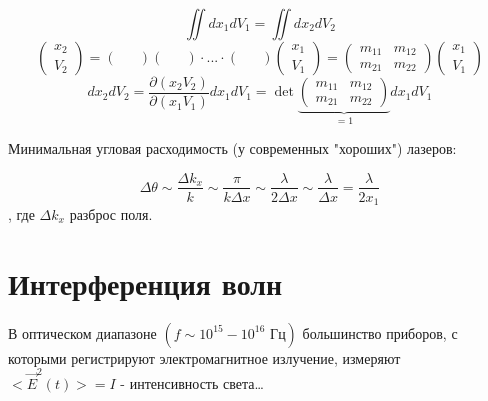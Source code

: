 \documentclass[12pt, a4paper]{report}
\begin{document}
\begin{theorem}
    \[ \iint d x_1 d V_1 = \iint d x_2 d V_2  \] 
    \[\begin{pmatrix}
    x_2\\
    V_2
    \end{pmatrix} = \begin{pmatrix}
    &\\
    &
    \end{pmatrix} 
    \begin{pmatrix}
        &\\
        &
    \end{pmatrix} \cdot ... \cdot 
    \begin{pmatrix}
        &\\
        &
    \end{pmatrix}
    \begin{pmatrix}
        x_1\\
        V_1
    \end{pmatrix} =\begin{pmatrix}
    m_{11}  & m_{12}\\
    m_{21}& m_{22} 
    \end{pmatrix} 
    \begin{pmatrix}
        x_1\\
        V_1
    \end{pmatrix}    \] 
    \[ d x_2 d V_2  = \frac{\partial  (x_2 V_2 )}{\partial (x_1  V_1 )} d x_1 d V_1 = \det \underbrace{\begin{pmatrix}
        m_{11}  & m_{12}\\
        m_{21}& m_{22}
    \end{pmatrix} }_{= 1} d x_1 d V_1 \] 
\end{theorem} 

Минимальная угловая расходимость (у современных "хороших") лазеров: 

\[ \Delta \theta \sim \frac{\Delta k_x}{k } \sim  \frac{\pi}{k \Delta x } \sim  \frac{ \lambda }{2 \Delta x } \sim \frac{\lambda }{\Delta x } = \frac{\lambda }{2 x_1 }      \] 
, где \( \Delta k_x \)  разброс поля.

\section{Интерференция волн}

В оптическом диапазоне \( (f \sim  10 ^{15 }  - 10 ^{16 } \text{ Гц} ) \) большинство приборов, с которыми регистрируют электромагнитное излучение, измеряют \( <\vec{E } ^2 (t)> = I \) - интенсивность света\dots
\end{document}
